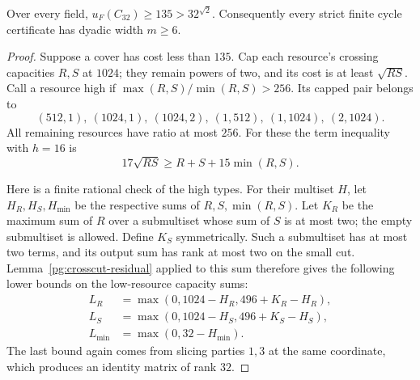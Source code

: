 \begin{proposition}[PG-CYCLE-Q32]
\label{pg:cycle-q32}
Over every field, $u_F(C_{32})\geq135>32^{\sqrt2}$.
Consequently every strict finite cycle certificate has dyadic
width $m\geq6$.
\end{proposition}
\begin{proof}
Suppose a cover has cost less than $135$. Cap each resource's
crossing capacities $R,S$ at $1024$; they remain powers of two,
and its cost is at least $\sqrt{RS}$. Call a resource high if
$\max(R,S)/\min(R,S)>256$. Its capped pair belongs to
\[
 (512,1),\ (1024,1),\ (1024,2),\
 (1,512),\ (1,1024),\ (2,1024).
 \tag{PG-Q32-high-types}
\]
All remaining resources have ratio at most $256$. For these the
term inequality with $h=16$ is
\[
 17\sqrt{RS}\geq R+S+15\min(R,S).
 \tag{PG-Q32-low-inequality}
\]

Here is a finite rational check of the high types. For their
multiset $H$, let $H_R,H_S,H_{\min}$ be the respective sums of
$R,S,\min(R,S)$. Let $K_R$ be the maximum sum of $R$ over a
submultiset whose sum of $S$ is at most two; the empty submultiset
is allowed. Define $K_S$ symmetrically. Such a submultiset has at
most two terms, and its output sum has rank at most two on the
small cut. Lemma~\ref{pg:crosscut-residual} applied to this sum
therefore gives the following lower bounds on the low-resource
capacity sums:
\[
 \begin{split}
 L_R&=\max(0,1024-H_R,496+K_R-H_R),\\
 L_S&=\max(0,1024-H_S,496+K_S-H_S),\\
 L_{\min}&=\max(0,32-H_{\min}).
 \end{split}
 \tag{PG-Q32-profile-bounds}
\]
The last bound again comes from slicing parties $1,3$ at the
same coordinate, which produces an identity matrix of rank $32$.


\end{proof}
